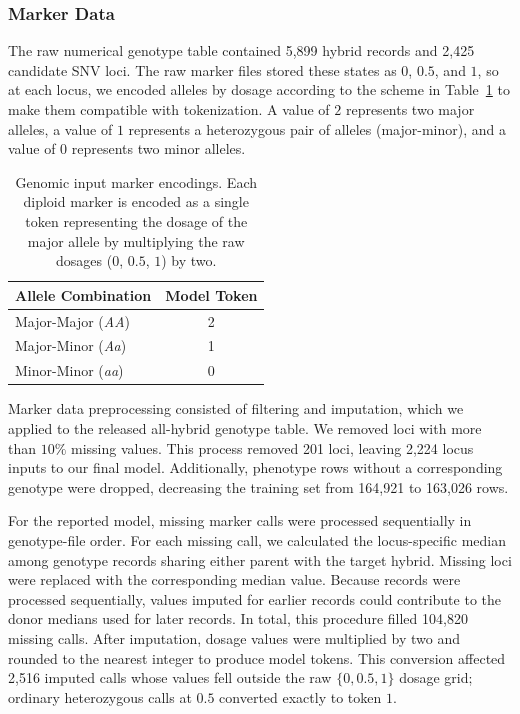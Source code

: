 \subsubsection{Marker Data}\label{sec:ch3-marker-preproc}
The raw numerical genotype table contained 5,899 hybrid records and 2,425 candidate SNV loci. The raw marker files stored these states as $0$, $0.5$, and $1$, so at each locus, we encoded alleles by dosage according to the scheme in Table~\ref{tab:ch3-vocabulary} to make them compatible with tokenization. A value of $2$ represents two major alleles, a value of $1$ represents a heterozygous pair of alleles (major-minor), and a value of $0$ represents two minor alleles.

\begin{table}[htbp]
    \centering
    \renewcommand{\arraystretch}{1.5}
    \begin{tabular}{@{} l c @{}}
        \toprule
        \textbf{Allele Combination} & \textbf{Model Token} \\
        \midrule
        Major-Major (\textit{AA}) & 2 \\
        Major-Minor (\textit{Aa}) & 1 \\
        Minor-Minor (\textit{aa}) & 0 \\
        \bottomrule
    \end{tabular}
    \caption[Genomic input marker encodings]{Genomic input marker encodings. Each diploid marker is encoded as a single token representing the dosage of the major allele by multiplying the raw dosages ($0$, $0.5$, $1$) by two.}
    \label{tab:ch3-vocabulary}
\end{table}

Marker data preprocessing consisted of filtering and imputation, which we applied to the released all-hybrid genotype table. We removed loci with more than $10\%$ missing values. This process removed 201 loci, leaving 2,224 locus inputs to our final model. Additionally, phenotype rows without a corresponding genotype were dropped, decreasing the training set from 164,921 to 163,026 rows.

For the reported model, missing marker calls were processed sequentially in genotype-file order. For each missing call, we calculated the locus-specific median among genotype records sharing either parent with the target hybrid. Missing loci were replaced with the corresponding median value. Because records were processed sequentially, values imputed for earlier records could contribute to the donor medians used for later records. In total, this procedure filled 104,820 missing calls. After imputation, dosage values were multiplied by two and rounded to the nearest integer to produce model tokens. This conversion affected 2,516 imputed calls whose values fell outside the raw $\{0, 0.5, 1\}$ dosage grid; ordinary heterozygous calls at $0.5$ converted exactly to token $1$.

